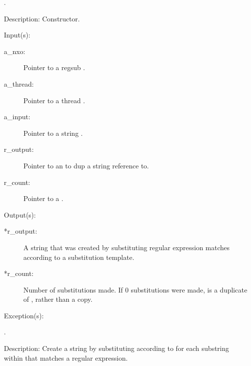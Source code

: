 \begin{capi}
\begin{capilist}
\begin{description}
		\item[.]
		\end{description}
	\item[Description: ]
		Constructor.
	\end{capilist}
\label{nxo_regsub_subst}
	\begin{capilist}
	\item[Input(s): ]
		\begin{description}\item[]
		\item[a\_nxo: ]
			Pointer to a regsub .
		\item[a\_thread: ]
			Pointer to a thread .
		\item[a\_input: ]
			Pointer to a string .
		\item[r\_output: ]
			Pointer to an  to dup a string reference
			to.
		\item[r\_count: ]
			Pointer to a .
		\end{description}
	\item[Output(s): ]
		\begin{description}\item[]
		\item[*r\_output: ]
			A string that was created by substituting regular
			expression matches according to a substitution template.
		\item[*r\_count: ]
			Number of substitutions made.  If 0 substitutions were
			made,  is a duplicate of
			, rather than a copy.
		\end{description}
	\item[Exception(s): ]
		\begin{description}\item[]
		\item[.]
		\end{description}
	\item[Description: ]
		Create a string by substituting according to 
		for each substring within  that matches a regular
		expression.


\end{capilist}
\end{capi}
